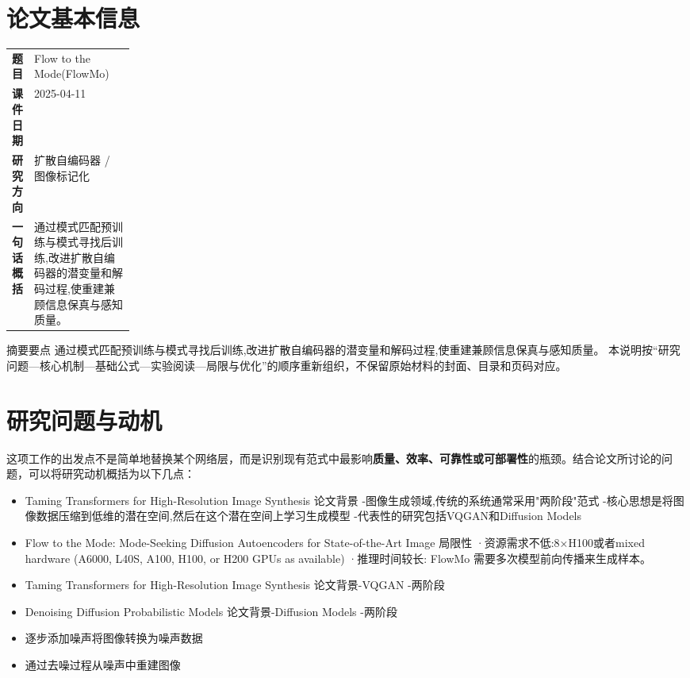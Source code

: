 \documentclass[UTF8,11pt,a4paper]{ctexart}
\newcommand{\term}[1]{\textbf{\textcolor{mainblue}{#1}}}
\begin{document}
\section{论文基本信息}
\begin{center}
\begin{tabularx}{0.94\linewidth}{>{\bfseries}p{0.18\linewidth}X}
\toprule
题目 & Flow to the Mode(FlowMo)\\
课件日期 & 2025-04-11\\
研究方向 & 扩散自编码器 / 图像标记化\\
一句话概括 & 通过模式匹配预训练与模式寻找后训练,改进扩散自编码器的潜变量和解码过程,使重建兼顾信息保真与感知质量。\\
\bottomrule
\end{tabularx}
\end{center}

\begin{infobox}{摘要要点}
通过模式匹配预训练与模式寻找后训练,改进扩散自编码器的潜变量和解码过程,使重建兼顾信息保真与感知质量。 本说明按“研究问题—核心机制—基础公式—实验阅读—局限与优化”的顺序重新组织，不保留原始材料的封面、目录和页码对应。
\end{infobox}

\section{研究问题与动机}
这项工作的出发点不是简单地替换某个网络层，而是识别现有范式中最影响\term{质量、效率、可靠性或可部署性}的瓶颈。结合论文所讨论的问题，可以将研究动机概括为以下几点：
\begin{itemize}
\item Taming Transformers for High-Resolution Image Synthesis 论文背景 -图像生成领域,传统的系统通常采用"两阶段"范式 -核心思想是将图像数据压缩到低维的潜在空间,然后在这个潜在空间上学习生成模型 -代表性的研究包括VQGAN和Diffusion Models
\item Flow to the Mode: Mode-Seeking Diffusion Autoencoders for State-of-the-Art Image 局限性 ·资源需求不低:8×H100或者mixed hardware (A6000, L40S, A100, H100, or H200 GPUs as available) ·推理时间较长: FlowMo 需要多次模型前向传播来生成样本。
\item Taming Transformers for High-Resolution Image Synthesis 论文背景-VQGAN -两阶段
\item Denoising Diffusion Probabilistic Models 论文背景-Diffusion Models -两阶段
\item 逐步添加噪声将图像转换为噪声数据
\item 通过去噪过程从噪声中重建图像
\end{itemize}
\end{document}
